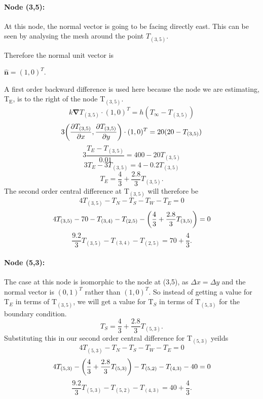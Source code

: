 \documentclass[12pt,a4paper]{article}
\begin{document}
\paragraph*{Node (3,5):} At this node, the normal vector is going to be facing directly east. This can be seen by analysing the mesh around the point $T_{(3,5)}$.
\begin{center}
\end{center}
Therefore the normal unit vector is 
\begin{center}
  $\hat{\textbf{n}}=(1,0)^T$.
\end{center}
A first order backward difference is used here because the node we are estimating, T$_\text{E}$, is to the right of the node T$_{(3,5)}$.
\[
  k\boldsymbol{\nabla}T_{(3,5)}\cdot(1,0)^T = h(T_{\infty} - T_{(3,5)})
\]
\[ 3\bigg{(}\frac{\partial T_{(3,5)}}{\partial x},\frac{\partial T_{(3,5)}}{\partial y}\bigg{)}\cdot(1,0)^T = 20(20 - T_{(3,5)})\]
\[3\frac{T_E-T_{(3,5)}}{0.01} = 400-20T_{(3,5)}\]
\[3T_E-3T_{(3,5)}=4-0.2T_{(3,5)}\]
\[T_E=\frac{4}{3}+\frac{2.8}{3}T_{(3,5)}.\]
The second order central difference at T$_{(3,5)}$ will therefore be 
\[4T_{(3,5)}-T_N-T_S-T_W-T_E=0\]
\[4T_{(3,5)}-70-T_{(3,4)}-T_{(2,5)}-\bigg{(}\frac{4}{3}+\frac{2.8}{3}T_{(3,5)}\bigg{)}=0\]
\[\frac{9.2}{3}T_{(3,5)}-T_{(3,4)}-T_{(2,5)}=70+\frac{4}{3}.\]
\paragraph*{Node (5,3):} The case at this node is isomorphic to the node at (3,5), as $\Delta x = \Delta y$ and the normal vector is $(0,1)^T$ rather than $(1,0)^T$. So instead of getting a value for T$_E$ in terms of T$_{(3,5)}$, we will get a value for T$_S$ in terms of T$_{(5,3)}$ for the boundary condition.
\[T_S=\frac{4}{3}+\frac{2.8}{3}T_{(5,3)}.\]
Substituting this in our second order central difference for T$_{(5,3)}$ yeilds
\[4T_{(5,3)}-T_N-T_S-T_W-T_E=0\]
\[4T_{(5,3)}-\bigg{(}\frac{4}{3}+\frac{2.8}{3}T_{(5,3)}\bigg{)}-T_{(5,2)}-T_{(4,3)}-40=0\]
\[\frac{9.2}{3}T_{(5,3)}-T_{(5,2)}-T_{(4,3)}=40+\frac{4}{3}.\]
\end{document}
